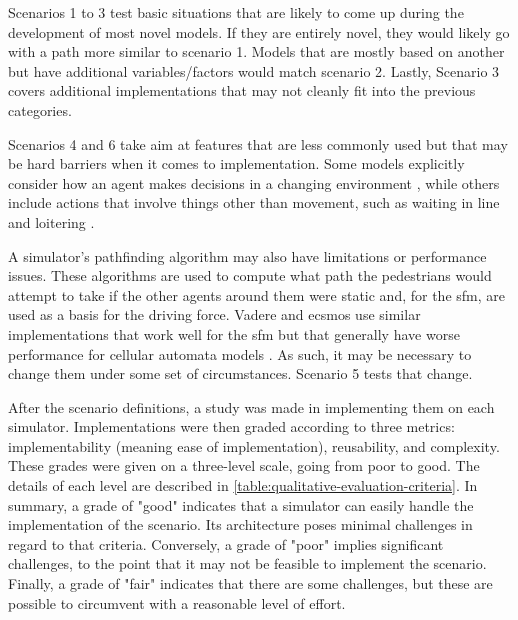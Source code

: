 \documentclass[twoside, 11pt]{article}
\begin{document}
Scenarios 1 to 3 test basic situations that are likely to come up during the development of most novel models. If they are entirely novel, they would likely go with a path more similar to scenario 1. Models that are mostly based on another but have additional variables/factors would match scenario 2. Lastly, Scenario 3 covers additional implementations that may not cleanly fit into the previous categories.



Scenarios 4 and 6 take aim at features that are less commonly used but that may be hard barriers when it comes to implementation. Some models explicitly consider how an agent makes decisions in a changing environment \cite{DEIULIIS2023104527}, while others include actions that involve things other than movement, such as waiting in line and loitering \cite{KIM2013232, ALAM2022100527}. 

A simulator's pathfinding algorithm may also have limitations or performance issues. These algorithms are used to compute what path the pedestrians would attempt to take if the other agents around them were static and, for the \acrlong{sfm}, are used as a basis for the driving force. Vadere and \gls{ecsmos} use similar implementations that work well for the \gls{sfm} but that generally have worse performance for cellular automata models \cite{kleinmeierVadereOpenSourceSimulation2019}. As such, it may be necessary to change them under some set of circumstances. Scenario 5 tests that change.

After the scenario definitions, a study was made in implementing them on each simulator. Implementations were then graded according to three metrics: implementability (meaning ease of implementation), reusability, and complexity. These grades were given on a three-level scale, going from poor to good. The details of each level are described in \autoref{table:qualitative-evaluation-criteria}. In summary, a grade of "good" indicates that a simulator can easily handle the implementation of the scenario. Its architecture poses minimal challenges in regard to that criteria. Conversely, a grade of "poor" implies significant challenges, to the point that it may not be feasible to implement the scenario. Finally, a grade of "fair" indicates that there are some challenges, but these are possible to circumvent with a reasonable level of effort.
\end{document}
